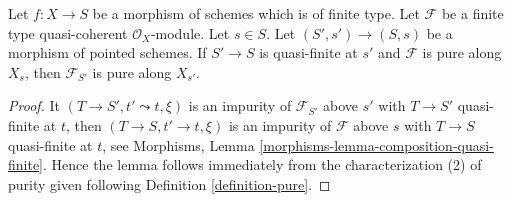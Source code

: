 \begin{lemma}
\label{lemma-quasi-finite-base-change}
Let $f : X \to S$ be a morphism of schemes which is of finite type.
Let $\mathcal{F}$ be a finite type quasi-coherent $\mathcal{O}_X$-module.
Let $s \in S$. Let $(S', s') \to (S, s)$ be a morphism of pointed schemes.
If $S' \to S$ is quasi-finite at $s'$ and $\mathcal{F}$ is pure along $X_s$,
then $\mathcal{F}_{S'}$ is pure along $X_{s'}$.
\end{lemma}

\begin{proof}
It $(T \to S', t' \leadsto t, \xi)$ is an impurity of
$\mathcal{F}_{S'}$ above $s'$ with $T \to S'$ quasi-finite at $t$,
then $(T \to S, t' \to t, \xi)$ is an impurity of $\mathcal{F}$
above $s$ with $T \to S$ quasi-finite at $t$, see
Morphisms, Lemma \ref{morphisms-lemma-composition-quasi-finite}.
Hence the lemma follows immediately from the characterization (2)
of purity given following
Definition \ref{definition-pure}.
\end{proof}

